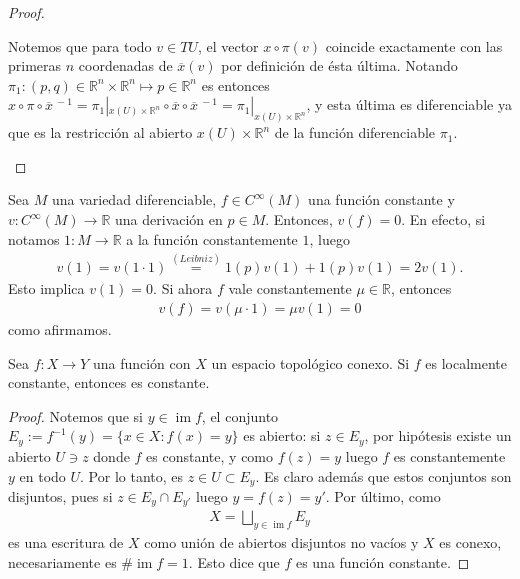 \documentclass[11pt]{article}
\newcommand{\R}{\mathbb{R}}
\newcommand{\im}{\operatorname{im}}
\newcommand{\paint}[2]{\color{#1}{#2}}
\newcommand{\ol}{\overline}
\newenvironment{lemma}[2][Lema]{\begin{trivlist}
\item[\hskip \labelsep \paint{red}{{\bfseries #1}}\hskip \labelsep {\bfseries #2.}]}{\end{trivlist}}
\newenvironment{obs}[2][Observaci\'on]{\begin{trivlist}
\item[\hskip \labelsep \paint{red}{{\bfseries #1}}\hskip \labelsep {\bfseries #2.}]}{\end{trivlist}}
\begin{document}
\begin{proof}
\begin{itemize}
\begin{center}
\end{center}
Notemos que para todo $v \in TU$, el vector $x \circ \pi(v)$ coincide exactamente con las primeras $n$ coordenadas de $\ol{x}(v)$ por definici\'on de \'esta \'ultima. Notando $\pi_1 : (p,q) \in \R^n \times \R^n \mapsto p \in \R^n$ es entonces $x\circ \pi \circ \ol{x}^{\ -1} = \pi_1|_{x(U) \times \R^n} \circ \ol{x} \circ \ol{x}^{\ -1}  = \pi_1|_{x(U) \times \R^n}$, y esta \'ultima es diferenciable ya que es la restricci\'on al abierto $x(U) \times \R^n$ de la funci\'on diferenciable $\pi_1$.
\end{itemize}
\end{proof}

\begin{obs}{1} Sea $M$ una variedad diferenciable, $f \in C^\infty(M)$ una funci\'on constante y $v : C^\infty(M) \to \R$ una derivaci\'on en $p \in M$. Entonces, $v(f) = 0$. En efecto, si notamos $1 : M \to \R$ a la funci\'on constantemente $1$, luego
\begin{align*}
v(1) = v(1 \cdot 1) \stackrel{(Leibniz)}{=} 1(p)v(1) + 1(p)v(1) = 2v(1).
\end{align*}
Esto implica $v(1) = 0$. Si ahora $f$ vale constantemente $\mu \in \R$, entonces 
\begin{align*}
v(f) = v(\mu \cdot 1) = \mu v(1) = 0
\end{align*}
como afirmamos.
\end{obs}

\begin{lemma}{2} Sea $f : X \to Y$ una funci\'on con $X$ un espacio topol\'ogico conexo. Si $f$ es localmente constante, entonces es constante.
\end{lemma}
\begin{proof} Notemos que si $y \in \im f$, el conjunto $E_y := f^{-1}(y) = \{x \in X : f(x) = y\}$ es abierto: si $z \in E_y$, por hip\'otesis existe un abierto $U \ni z$ donde $f$ es constante, y como $f(z) = y$ luego $f$ es constantemente $y$ en todo $U$. Por lo tanto, es $z \in U \subset E_y$. Es claro adem\'as que estos conjuntos son disjuntos, pues si $z \in E_y \cap E_{y'}$ luego $y = f(z) = y'$. Por \'ultimo, como 
\begin{align*}
X = \bigsqcup_{y \in \im f}E_y
\end{align*}
es una escritura de $X$ como uni\'on de abiertos disjuntos no vac\'ios y $X$ es conexo, necesariamente es $\#\im f = 1$. Esto dice que $f$ es una funci\'on constante. 
\end{proof}
\end{document}
